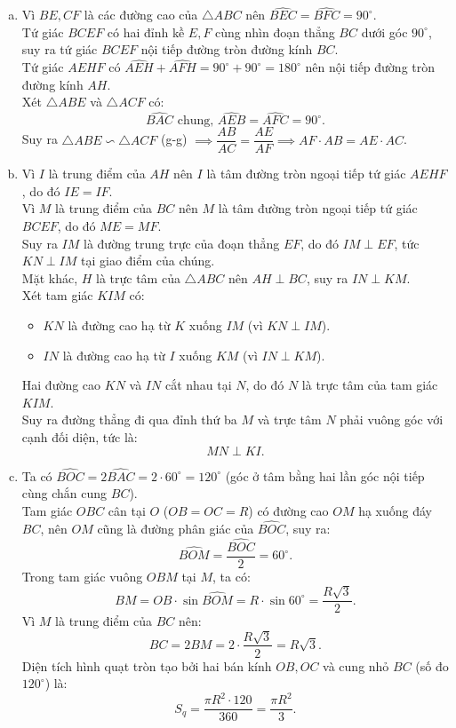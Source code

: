 \begin{bt}
{\begin{enumerate}[a)]
    \item Vì $BE, CF$ là các đường cao của $\triangle ABC$ nên $\widehat{BEC} = \widehat{BFC} = 90^\circ$.\\
    Tứ giác $BCEF$ có hai đỉnh kề $E, F$ cùng nhìn đoạn thẳng $BC$ dưới góc $90^\circ$, suy ra tứ giác $BCEF$ nội tiếp đường tròn đường kính $BC$.\\
    Tứ giác $AEHF$ có $\widehat{AEH} + \widehat{AFH} = 90^\circ + 90^\circ = 180^\circ$ nên nội tiếp đường tròn đường kính $AH$.\\
    Xét $\triangle ABE$ và $\triangle ACF$ có:
    $$\widehat{BAC}\text{ chung, } \widehat{AEB} = \widehat{AFC} = 90^\circ.$$
    Suy ra $\triangle ABE \backsim \triangle ACF$ (g-g) $\implies \dfrac{AB}{AC} = \dfrac{AE}{AF} \implies AF \cdot AB = AE \cdot AC$.
    \item Vì $I$ là trung điểm của $AH$ nên $I$ là tâm đường tròn ngoại tiếp tứ giác $AEHF$, do đó $IE = IF$.\\
    Vì $M$ là trung điểm của $BC$ nên $M$ là tâm đường tròn ngoại tiếp tứ giác $BCEF$, do đó $ME = MF$.\\
    Suy ra $IM$ là đường trung trực của đoạn thẳng $EF$, do đó $IM \perp EF$, tức $KN \perp IM$ tại giao điểm của chúng.\\
    Mặt khác, $H$ là trực tâm của $\triangle ABC$ nên $AH \perp BC$, suy ra $IN \perp KM$.\\
    Xét tam giác $KIM$ có:
    \begin{itemize}
        \item $KN$ là đường cao hạ từ $K$ xuống $IM$ (vì $KN \perp IM$).
        \item $IN$ là đường cao hạ từ $I$ xuống $KM$ (vì $IN \perp KM$).
    \end{itemize}
    Hai đường cao $KN$ và $IN$ cắt nhau tại $N$, do đó $N$ là trực tâm của tam giác $KIM$.\\
    Suy ra đường thẳng đi qua đỉnh thứ ba $M$ và trực tâm $N$ phải vuông góc với cạnh đối diện, tức là:
    $$MN \perp KI.$$
    \item Ta có $\widehat{BOC} = 2\widehat{BAC} = 2 \cdot 60^\circ = 120^\circ$ (góc ở tâm bằng hai lần góc nội tiếp cùng chắn cung $BC$).\\
    Tam giác $OBC$ cân tại $O$ ($OB = OC = R$) có đường cao $OM$ hạ xuống đáy $BC$, nên $OM$ cũng là đường phân giác của $\widehat{BOC}$, suy ra:
    $$\widehat{BOM} = \dfrac{\widehat{BOC}}{2} = 60^\circ.$$
    Trong tam giác vuông $OBM$ tại $M$, ta có:
    $$BM = OB \cdot \sin \widehat{BOM} = R \cdot \sin 60^\circ = \dfrac{R\sqrt{3}}{2}.$$
    Vì $M$ là trung điểm của $BC$ nên:
    $$BC = 2BM = 2 \cdot \dfrac{R\sqrt{3}}{2} = R\sqrt{3}.$$
    Diện tích hình quạt tròn tạo bởi hai bán kính $OB, OC$ và cung nhỏ $BC$ (số đo $120^\circ$) là:
    $$S_q = \dfrac{\pi R^2 \cdot 120}{360} = \dfrac{\pi R^2}{3}.$$
\end{enumerate}
}
\end{bt}

